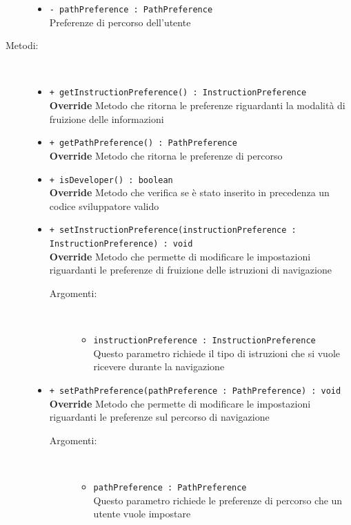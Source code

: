 \documentclass[../DefinizioneDiProdotto.tex]{subfiles}
\begin{document}
\begin{description}
\begin{itemize}
\item \texttt{- pathPreference : PathPreference}\\
Preferenze di percorso dell'utente

\end{itemize}
\item[Metodi:] \
\begin{itemize}
\item \texttt{+ getInstructionPreference() : InstructionPreference}\\
\textbf{Override} Metodo che ritorna le preferenze riguardanti la modalità di fruizione delle informazioni
 \item \texttt{+ getPathPreference() : PathPreference}\\
\textbf{Override} Metodo che ritorna le preferenze di percorso
 \item \texttt{+ isDeveloper() : boolean}\\
\textbf{Override} Metodo che verifica se è stato inserito in precedenza un codice sviluppatore valido
 \item \texttt{+ setInstructionPreference(instructionPreference : InstructionPreference) : void}\\
\textbf{Override} Metodo che permette di modificare le impostazioni riguardanti le preferenze di fruizione delle istruzioni di navigazione
 \begin{description}
\item[Argomenti:] \
\begin{itemize}
\item \texttt{instructionPreference : InstructionPreference}\\
Questo parametro richiede il tipo di istruzioni che si vuole ricevere durante la navigazione \end{itemize}
\end{description}
\item \texttt{+ setPathPreference(pathPreference : PathPreference) : void}\\
\textbf{Override} Metodo che permette di modificare le impostazioni riguardanti le preferenze sul percorso di navigazione
 \begin{description}
\item[Argomenti:] \
\begin{itemize}
\item \texttt{pathPreference : PathPreference}\\
Questo parametro richiede le preferenze di percorso che un utente vuole impostare\end{itemize}

\end{description}
\end{itemize}
\end{description}
\end{document}

